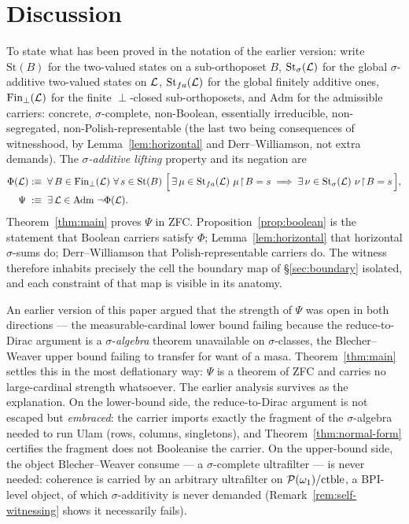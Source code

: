 \section{Discussion}\label{sec:discussion}

To state what has been proved in the notation of the earlier version: write
$\mathrm{St}(B)$ for the two-valued states on a sub-orthoposet $B$,
$\mathrm{St}_\sigma(\mathcal{L})$ for the global $\sigma$-additive two-valued states on
$\mathcal{L}$, $\mathrm{St}_{fa}(\mathcal{L})$ for the global finitely additive ones,
$\mathrm{Fin}_\perp(\mathcal{L})$ for the finite $\perp$-closed sub-orthoposets, and
$\mathrm{Adm}$ for the admissible carriers: concrete, $\sigma$-complete,
non-Boolean, essentially irreducible, non-segregated, non-Polish-representable
(the last two being consequences of witnesshood, by Lemma~\ref{lem:horizontal}
and Derr--Williamson, not extra demands). The \emph{$\sigma$-additive lifting}
property and its negation are
\begin{align*}
  \Phi(\mathcal{L})
    &:\equiv\;
    \forall\, B \in \mathrm{Fin}_\perp(\mathcal{L})\
    \forall\, s \in \mathrm{St}(B)\ \Bigl[\,
    \exists\,\mu\in\mathrm{St}_{fa}(\mathcal{L})\ \mu\!\restriction\! B=s
    \;\Longrightarrow\;
    \exists\, \nu \in \mathrm{St}_\sigma(\mathcal{L})\ \nu \!\restriction\! B = s \,\Bigr],\\
  \Psi \;&:\equiv\; \exists\, \mathcal{L} \in \mathrm{Adm}\ \neg\Phi(\mathcal{L}).
\end{align*}
Theorem~\ref{thm:main} proves $\Psi$ in ZFC. Proposition~\ref{prop:boolean} is
the statement that Boolean carriers satisfy $\Phi$; Lemma~\ref{lem:horizontal}
that horizontal $\sigma$-sums do; Derr--Williamson that Polish-representable
carriers do. The witness therefore inhabits precisely the cell the boundary map
of \S\ref{sec:boundary} isolated, and each constraint of that map is visible in
its anatomy.

\begin{remark}\label{rem:strength}
An earlier version of this paper argued that the strength of $\Psi$ was open in
both directions --- the measurable-cardinal lower bound failing because the
reduce-to-Dirac argument is a $\sigma$-\emph{algebra} theorem unavailable on
$\sigma$-classes, the Blecher--Weaver upper bound failing to transfer for want of
a masa. Theorem~\ref{thm:main} settles this in the most deflationary way: $\Psi$
is a theorem of ZFC and carries no large-cardinal strength whatsoever. The
earlier analysis survives as the explanation. On the lower-bound side, the
reduce-to-Dirac argument is not escaped but \emph{embraced}: the carrier imports
exactly the fragment of the $\sigma$-algebra needed to run Ulam (rows, columns,
singletons), and Theorem~\ref{thm:normal-form} certifies the fragment does not
Booleanise the carrier. On the upper-bound side, the object Blecher--Weaver
consume --- a $\sigma$-complete ultrafilter --- is never needed: coherence is
carried by an arbitrary ultrafilter on $\mathcal{P}(\omega_1)/\mathrm{ctble}$, a
BPI-level object, of which $\sigma$-additivity is never demanded
(Remark~\ref{rem:self-witnessing} shows it necessarily fails).
\end{remark}

